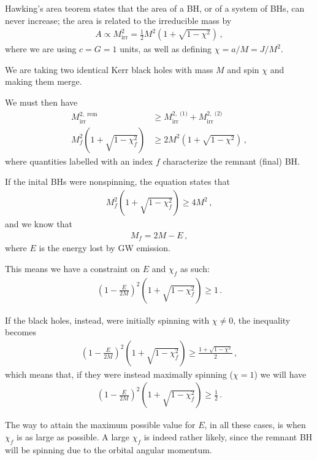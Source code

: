 \documentclass[main.tex]{subfiles}
\begin{document}
Hawking's area teorem states that the area of a BH, or of a system of BHs, can never increase; the area is related to the irreducible mass by 
%
\begin{align}
A \propto M _{\text{irr}}^2 = \frac{1}{2} M^2\left(1 + \sqrt{1 - \chi^2}\right)
\,,
\end{align}
%
where we are using \(c = G = 1\) units, as well as defining \(\chi = a / M = J / M^2\).  

We are taking two identical Kerr black holes with mass \(M\) and spin \(\chi\) and making them merge. 

We must then have %
\begin{align}
M_{\text{irr}}^{2, \text{ rem}} &\geq 
M^{2, \text{ (1)}} _{\text{irr}}  +
M^{2, \text{ (2)}} _{\text{irr}}  
\\
M_f^2 \left( 1+ \sqrt{1 - \chi _f^2}\right) &\geq 2 M^2\left(1 + \sqrt{1 - \chi^2}\right)
\,,
\end{align}
%
where quantities labelled with an index \(f\) characterize the remnant  (final) BH. 

If the inital BHs were nonspinning, the equation states that %
\begin{align}
M_f^2 \left(1 + \sqrt{1 - \chi _f^2}\right) \geq 4 M^2
\,,
\end{align}
%
and we know that %
\begin{align}
M_f = 2M - E
\,,
\end{align}
%
where \(E\) is the energy lost by GW emission. 

This means we have a constraint on \(E\) and \(\chi _f\) as such: %
\begin{align}
\left(1 - \frac{E}{2M}\right)^2 \left(1 + \sqrt{1 - \chi _f^2}\right) \geq 1
\,.
\end{align}

If the black holes, instead, were initially spinning with \(\chi \neq 0\), the inequality becomes %
\begin{align}
\left(1 - \frac{E}{2M}\right)^2 \left(1 + \sqrt{1 - \chi _f^2}\right) \geq \frac{1 + \sqrt{1 - \chi^2}}{2}
\,,
\end{align}
%
which means that, if they were instead maximally spinning (\(\chi = 1\)) we will have 
%
\begin{align}
\left(1 - \frac{E}{2M}\right)^2 \left(1 + \sqrt{1 - \chi _f^2}\right) \geq \frac{1}{2}
\,.
\end{align}

The way to attain the maximum possible value for \(E\), in all these cases, is when \(\chi _f\) is as large as possible. 
A large \(\chi _f\) is indeed rather likely, since the remnant BH will be spinning due to the orbital angular momentum. 
\end{document}
